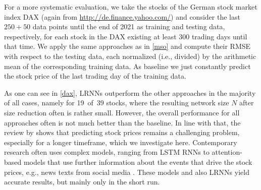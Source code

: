 \documentclass[twoside,11pt]{article}
\theoremstyle{definition}
\begin{document}
For a more systematic evaluation, we take the stocks of the German stock market
index DAX (again from \url{http://de.finance.yahoo.com/}) and consider the last
$250+50$ data points until the end of 2021 as training and testing data,
respectively, for each stock in the DAX existing at least $300$ trading days
until that time. We apply the same approaches as in \cref{mso} and compute their
RMSE with respect to the testing data, each normalized (i.e., divided) by the
arithmetic mean of the corresponding training data. As baseline we just
constantly predict the stock price of the last trading day of the training data.

As one can see in \cref{dax}, LRNNs outperform the other approaches in the
majority of all cases, namely for 19~of~39 stocks, where the resulting network
size $N$ after size reduction often is rather small. However, the overall
performance for all approaches often is not much better than the baseline. In
line with that, the review by \citet{SIZ19} shows that predicting stock prices
remains a challenging problem, especially for a longer timeframe, which we
investigate
here. Contemporary research often uses complex models, ranging from LSTM RNNs
\citep{NPO17,RPV17} to attention-based models that use further information about
the events that drive the stock prices, e.g., news texts from social media
\citep{LL+19}. These models and also LRNNs yield accurate results, but mainly
only in the short run.
\end{document}
